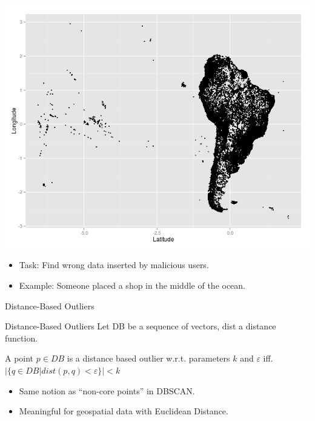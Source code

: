 \documentclass{beamer}
\begin{document}
\begin{frame}
    \begin{center}
    \includegraphics[width=.7\textwidth]{images/south_america.png} 
    \end{center}
    \begin{itemize}
        \item Task: Find wrong data inserted by malicious users.

        \item Example: Someone placed a shop in the middle of the ocean.

    \end{itemize}
\end{frame}
\begin{frame}{Distance-Based Outliers}
    \begin{block}{Distance-Based Outliers}
        Let DB be a sequence of vectors, dist a distance function.

        A point $p\in DB$ is a distance based outlier w.r.t. parameters $k$ and $\varepsilon$
        iff. $|\{q\in DB | dist(p,q) < \varepsilon\}| < k$
    \end{block}

    \begin{itemize}
        \item Same notion as ``non-core points'' in DBSCAN.
        \item Meaningful for geospatial data with Euclidean Distance.
    \end{itemize}
\end{frame}
\end{document}
